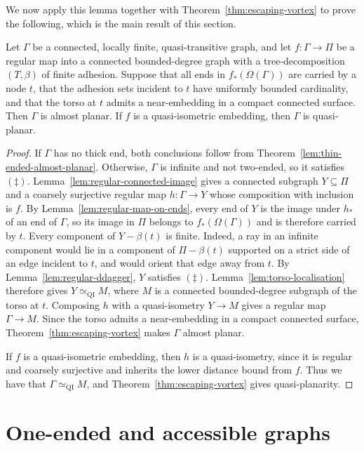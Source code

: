 \documentclass[a4paper]{amsart}
\begin{document}
We now apply this lemma together with Theorem~\ref{thm:escaping-vortex} to prove the following, which is the main result of this section. 

\begin{proposition}\label{prop:end-localisation}
Let $\Gamma$ be a connected, locally finite, quasi-transitive graph, and let $f:\Gamma\to\Pi$ be a regular map into a connected bounded-degree graph with a tree-decomposition $(T,\beta)$ of finite adhesion.
Suppose that all ends in $f_*(\Omega(\Gamma))$ are carried by a node $t$, that the adhesion sets incident to $t$ have uniformly bounded cardinality, and that the torso at $t$ admits a near-embedding in a compact connected surface.
Then $\Gamma$ is almost planar.
If $f$ is a quasi-isometric embedding, then $\Gamma$ is quasi-planar.
\end{proposition}

\begin{proof}
If $\Gamma$ has no thick end, both conclusions follow from Theorem~\ref{lem:thin-ended-almost-planar}.
Otherwise, $\Gamma$ is infinite and not two-ended, so it satisfies $(\ddagger)$.
Lemma~\ref{lem:regular-connected-image} gives a connected subgraph $Y\subseteq\Pi$ and a coarsely surjective regular map $h:\Gamma\to Y$ whose composition with inclusion is $f$.
By Lemma~\ref{lem:regular-map-on-ends}, every end of $Y$ is the image under $h_*$ of an end of $\Gamma$, so its image in $\Pi$ belongs to $f_*(\Omega(\Gamma))$ and is therefore carried by $t$.
Every component of $Y-\beta(t)$ is finite.
Indeed, a ray in an infinite component would lie in a component of $\Pi-\beta(t)$ supported on a strict side of an edge incident to $t$, and would orient that edge away from $t$.
By Lemma~\ref{lem:regular-ddagger}, $Y$ satisfies $(\ddagger)$.
Lemma~\ref{lem:torso-localisation} therefore gives $Y\simeq_{\mathrm{QI}}M$, where $M$ is a connected bounded-degree subgraph of the torso at $t$. 
Composing $h$ with a quasi-isometry $Y\to M$ gives a regular map $\Gamma\to M$. 
Since the torso admits a near-embedding in a compact connected surface, Theorem~\ref{thm:escaping-vortex} makes $\Gamma$ almost planar.

If $f$ is a quasi-isometric embedding, then $h$ is a quasi-isometry, since it is regular and coarsely surjective and inherits the lower distance bound from $f$. Thus we have that $\Gamma\simeq_{\mathrm{QI}}M$, and Theorem~\ref{thm:escaping-vortex} gives quasi-planarity.
\end{proof}

\section{One-ended and accessible graphs}\label{sec:one-ended-case}
\end{document}
